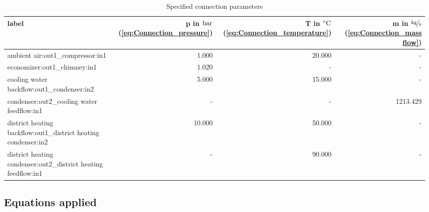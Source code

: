 \begin{table}[H]\begin{center}
\begin{tabular}{lrrr}
\toprule
                                                          label &  p in $\unit[]{bar}$ (\ref{eq:Connection_pressure}) &  T in $\unit[]{^\circ C}$ (\ref{eq:Connection_temperature}) &  m in $\unitfrac[]{kg}{s}$ (\ref{eq:Connection_mass flow}) \\
\midrule
                               ambient air:out1\_compressor:in1 &                                               1.000 &                                                      20.000 &                                                          - \\
                                   economizer:out1\_chimney:in1 &                                               1.020 &                                                           - &                                                          - \\
                     cooling water backflow:out1\_condenser:in2 &                                               5.000 &                                                      15.000 &                                                          - \\
                     condenser:out2\_cooling water feedflow:in1 &                                                   - &                                                           - &                                                   1213.429 \\
 district heating backflow:out1\_district heating condenser:in2 &                                              10.000 &                                                      50.000 &                                                          - \\
 district heating condenser:out2\_district heating feedflow:in1 &                                                   - &                                                      90.000 &                                                          - \\
\bottomrule
\end{tabular}
\caption{Specified connection parameters}
\end{center}\end{table}

\subsection{Equations applied}

